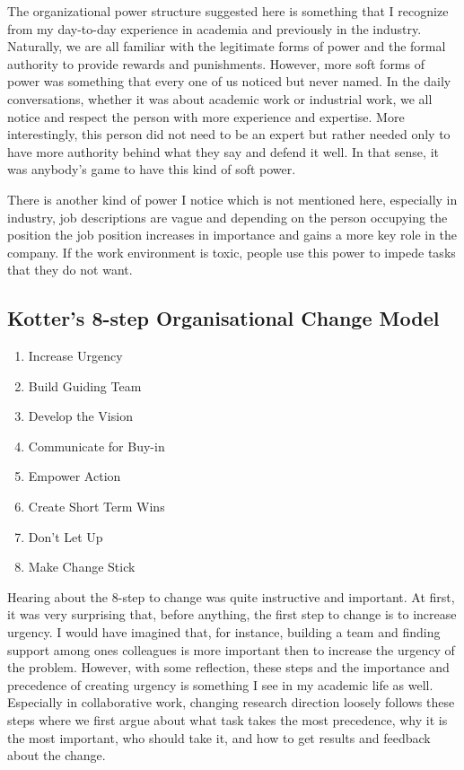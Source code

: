 \documentclass[pra, onecolumn,superscriptaddress,nofootinbib]{revtex4}
\begin{document}
    The organizational power structure suggested here is something that I recognize from my day-to-day experience in academia and previously in the industry. Naturally, we are all familiar with the legitimate forms of power and the formal authority to provide rewards and punishments. However, more soft forms of power was something that every one of us noticed but never named. In the daily conversations, whether it was about academic work or industrial work, we all notice and respect the person with more experience and expertise. More interestingly, this person did not need to be an expert but rather needed only to have more authority behind what they say and defend it well. In that sense, it was anybody's game to have this kind of soft power.
    
    There is another kind of power I notice which is not mentioned here, especially in industry, job descriptions are vague and depending on the person occupying the position the job position increases in importance and gains a more key role in the company. If the work environment is toxic, people use this power to impede tasks that they do not want.


\subsection{Kotter’s 8-step Organisational Change Model}
    \begin{enumerate}[Step 1:]
        \item Increase Urgency
        \item Build Guiding Team
        \item Develop the Vision
        \item Communicate for Buy-in
        \item Empower Action
        \item Create Short Term Wins
        \item Don't Let Up
        \item Make Change Stick
    \end{enumerate}

    Hearing about the 8-step to change was quite instructive and important. At first, it was very surprising that, before anything, the first step to change is to increase urgency. I would have imagined that, for instance, building a team and finding support among ones colleagues is more important then to increase the urgency of the problem. However, with some reflection, these steps and the importance and precedence of creating urgency is something I see in my academic life as well. Especially in collaborative work, changing research direction loosely follows these steps where we first argue about what task takes the most precedence, why it is the most important, who should take it, and how to get results and feedback about the change.
\end{document}
